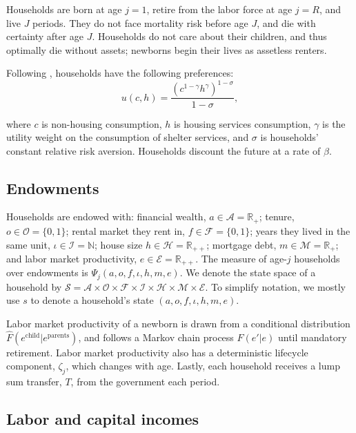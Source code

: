 \documentclass[parskip=full]{article}
\begin{document}
Households are born at age $j=1$, retire from the labor force at age $j=R$, and live $J$ periods. They do not face mortality risk before age $J$, and die with certainty after age $J$. Households do not care about their children, and thus optimally die without assets; newborns begin their lives as assetless renters.

Following \citet{sommersullivan-2017}, households have the following preferences:
\begin{equation*}
    u(c,h)=\frac{\left(c^{1-\gamma} h^{\gamma}\right)^{1-\sigma}}{1-\sigma},
\end{equation*}

\noindent where $c$ is non-housing consumption, $h$ is housing services consumption, $\gamma$ is the utility weight on the consumption of shelter services, and $\sigma$ is households' constant relative risk aversion. Households discount the future at a rate of $\beta$. 

\subsection{Endowments}

Households are endowed with: financial wealth, $a\in \mathcal{A}=\mathbb{R}_+$; tenure, $o \in \mathcal{O}=\{0,1\}$; rental market they rent in, $f \in \mathcal{F}=\{0,1\}$; years they lived in the same unit, $\iota \in \mathcal{I}=\mathbb{N}$; house size $h\in \mathcal{H}=\mathbb{R}_{++}$; mortgage debt, $m\in \mathcal{M}=\mathbb{R}_+$; and labor market productivity, $e \in\mathcal{E} = \mathbb{R}_{++}$. The measure of age-$j$ households over endowments is $\Psi_{j}(a,o,f,\iota,h,m,e)$. We denote the state space of a household by  $\mathcal{S}=\mathcal{A}\times\mathcal{O}\times\mathcal{F}\times\mathcal{I}\times\mathcal{H}\times\mathcal{M}\times\mathcal{E}$. To simplify notation, we mostly use $s$ to denote a household's state $(a,o,f,\iota,h,m,e)$.

Labor market productivity of a newborn is drawn from a conditional distribution \\ $\hat{F}(e^{\mbox{child}}|e^{\mbox{parents}})$, and follows a Markov chain process $F(e'|e)$ until mandatory retirement. Labor market productivity also has a deterministic lifecycle component, $\zeta_j$, which changes with age. Lastly, each household receives a lump sum transfer, $T$, from the government each period.

\subsection{Labor and capital incomes}\label{subsection:income}
\end{document}

